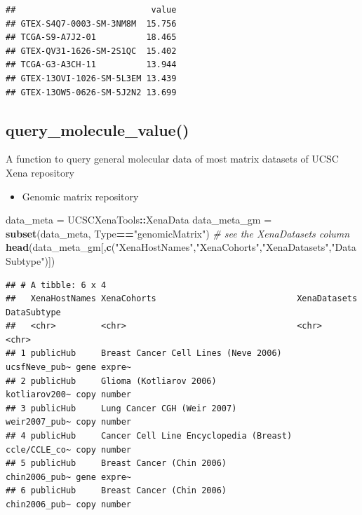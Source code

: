 \documentclass[
]{book}
\newenvironment{Shaded}{\begin{snugshade}}{\end{snugshade}}
\newcommand{\CommentTok}[1]{\textcolor[rgb]{0.56,0.35,0.01}{\textit{#1}}}
\newcommand{\FunctionTok}[1]{\textcolor[rgb]{0.13,0.29,0.53}{\textbf{#1}}}
\newcommand{\NormalTok}[1]{#1}
\newcommand{\OtherTok}[1]{\textcolor[rgb]{0.56,0.35,0.01}{#1}}
\newcommand{\SpecialCharTok}[1]{\textcolor[rgb]{0.81,0.36,0.00}{\textbf{#1}}}
\newcommand{\StringTok}[1]{\textcolor[rgb]{0.31,0.60,0.02}{#1}}
\providecommand{\tightlist}{%
  \setlength{\itemsep}{0pt}\setlength{\parskip}{0pt}}
\begin{document}
\begin{verbatim}
##                           value
## GTEX-S4Q7-0003-SM-3NM8M  15.756
## TCGA-S9-A7J2-01          18.465
## GTEX-QV31-1626-SM-2S1QC  15.402
## TCGA-G3-A3CH-11          13.944
## GTEX-13OVI-1026-SM-5L3EM 13.439
## GTEX-13OW5-0626-SM-5J2N2 13.699
\end{verbatim}

\subsection{query\_molecule\_value()}\label{query_molecule_value}

A function to query general molecular data of most matrix datasets of UCSC Xena repository

\begin{itemize}
\tightlist
\item
  Genomic matrix repository
\end{itemize}

\begin{Shaded}
\begin{Highlighting}[]
\NormalTok{data\_meta }\OtherTok{=}\NormalTok{ UCSCXenaTools}\SpecialCharTok{::}\NormalTok{XenaData}
\NormalTok{data\_meta\_gm }\OtherTok{=} \FunctionTok{subset}\NormalTok{(data\_meta, Type}\SpecialCharTok{==}\StringTok{"genomicMatrix"}\NormalTok{)}
\CommentTok{\# see the \textquotesingle{}XenaDatasets\textquotesingle{} column}
\FunctionTok{head}\NormalTok{(data\_meta\_gm[,}\FunctionTok{c}\NormalTok{(}\StringTok{"XenaHostNames"}\NormalTok{,}\StringTok{"XenaCohorts"}\NormalTok{,}\StringTok{"XenaDatasets"}\NormalTok{,}\StringTok{"DataSubtype"}\NormalTok{)])}
\end{Highlighting}
\end{Shaded}

\begin{verbatim}
## # A tibble: 6 x 4
##   XenaHostNames XenaCohorts                            XenaDatasets  DataSubtype
##   <chr>         <chr>                                  <chr>         <chr>      
## 1 publicHub     Breast Cancer Cell Lines (Neve 2006)   ucsfNeve_pub~ gene expre~
## 2 publicHub     Glioma (Kotliarov 2006)                kotliarov200~ copy number
## 3 publicHub     Lung Cancer CGH (Weir 2007)            weir2007_pub~ copy number
## 4 publicHub     Cancer Cell Line Encyclopedia (Breast) ccle/CCLE_co~ copy number
## 5 publicHub     Breast Cancer (Chin 2006)              chin2006_pub~ gene expre~
## 6 publicHub     Breast Cancer (Chin 2006)              chin2006_pub~ copy number
\end{verbatim}
\end{document}
